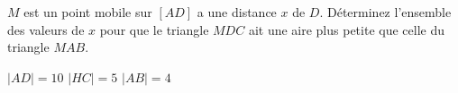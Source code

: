 %
%
    \(M\) est un point mobile sur \([AD]\) a une distance \(x\) de \(D\). Déterminez l'ensemble des valeurs de \(x\) pour que le triangle \(MDC\) ait une aire plus petite que celle du triangle \(MAB\).

    \parbox{3cm}{%
        \(\lvert AD \rvert=10\)\medbreak
        \(\lvert HC \rvert=5\)\medbreak
        \(\lvert AB \rvert=4\)%
    }
    \hfil
